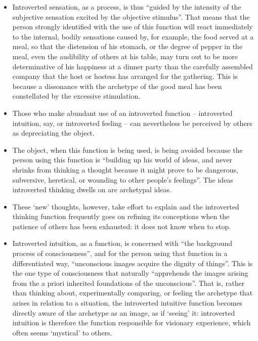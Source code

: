 \begin{itemize}
\item Introverted sensation, as a process, is thus ``guided by the intensity of
the subjective sensation excited by the objective stimulus''. That means that
the person strongly identified with the use of this function will react
immediately to the internal, bodily sensations caused by, for example, the food
served at a meal, so that the distension of his stomach, or the degree of
pepper in the meal, even the audibility of others at his table, may turn out to
be more determinative of his happiness at a dinner party than the carefully
assembled company that the host or hostess has arranged for the gathering. This
is because a dissonance with the archetype of the good meal has been
constellated by the excessive stimulation.

\item Those who make abundant use of an introverted function -- introverted
intuition, say, or introverted feeling -- can nevertheless be perceived by
others as depreciating the object.

\item The object, when this function is being used, is being avoided because
the person using this function is ``building up his world of ideas, and never
shrinks from thinking a thought because it might prove to be dangerous,
subversive, heretical, or wounding to other people's feelings''. The ideas
introverted thinking dwells on are archetypal ideas.

\item These `new' thoughts, however, take effort to explain and the introverted
thinking function frequently goes on refining its conceptions when the patience
of others has been exhausted: it does not know when to stop.

\item Introverted intuition, as a function, is concerned with ``the background
process of consciousness'', and for the person using that function in a
differentiated way, ``unconscious images acquire the dignity of things''. This
is the one type of consciousness that naturally ``apprehends the images arising
from the a priori inherited foundations of the unconscious''.  That is, rather
than thinking about, experimentally comparing, or feeling the archetype that
arises in relation to a situation, the introverted intuitive function becomes
directly aware of the archetype as an image, as if `seeing' it: introverted
intuition is therefore the function responsible for visionary experience, which
often seems `mystical' to others.


\end{itemize}

